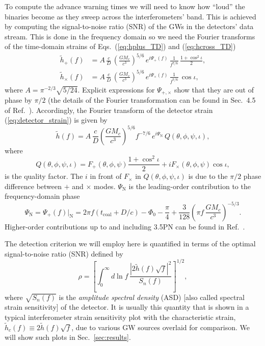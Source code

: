 \documentclass[11pt,a4paper]{article}
\newcommand{\f}{\frac}
\newcommand{\be}{\begin{equation}}
\newcommand{\ee}{\end{equation}}
\begin{document}
To compute the advance warning times we will need to know how ``loud'' the binaries become as they sweep across the interferometers' band.
This is achieved by computing the signal-to-noise ratio (SNR) of the GWs in the detectors' data stream.
This is done in the frequency domain so we need the Fourier transforms of the time-domain strains of Eqs.~(\ref{eq:hplus_TD}) and (\ref{eq:hcross_TD})
%
\begin{align}
 \tilde{h}_+(f) &= A \, \f{c}{D}\, \left(\f{G M_c}{c^3}\right)^{5/6}\, e^{i \Psi_+(f)}\, \f{1}{f^{7/6}}\,  \f{1+\cos^2\iota}{2}  ,\label{eq:hplus_FD}\\
 \tilde{h}_\times(f) & = A \, \f{c}{D}\, \left(\f{G M_c}{c^3}\right)^{5/6}\, e^{i \Psi_\times(f)}\, \f{1}{f^{7/6}}\, \cos\iota \label{eq:hcross_FD},
\end{align}
%
%
where $A= \pi^{-2/3} \sqrt{5/24}$.
Explicit expressions for $\Psi_{+,\times}$ show that they are out of phase by $\pi/2$
(the details of the Fourier transformation can be found in Sec.~4.5 of Ref.~\cite{Maggiore}).
Accordingly, the Fourier transform of the detector strain (\ref{eq:detector_strain}) is given by
%
\be
\tilde{h}(f) = A\, \f{c}{D}\left(\f{G M_c}{c^3}\right)^{5/6} f^{-7/6}\, e^{i\Psi_\text{N}}\, Q(\theta,\phi,\psi,\iota), \label{eq:strain_FD}
\ee
%
where 
%
\be
Q(\theta,\phi,\psi,\iota) = F_+(\theta,\phi,\psi)\f{1+\cos^2\iota}{2}  + i F_\times(\theta,\phi,\psi) \cos\iota \label{eq:Q},
\ee
%
is the quality factor.
The $i$ in front of $F_\times$ in $Q(\theta,\phi,\psi,\iota)$ is due to the $\pi/2$ phase difference between $+$ and $\times$ modes.
$\Psi_\text{N}$ is the leading-order contribution to the frequency-domain phase
%
\be
\Psi_\text{N}=\Psi_+(f)|_\text{N} = 2\pi f (t_\text{coal}+D/c)-\Phi_0-\f{\pi}{4}+ \f{3}{128}\left(\pi f\,\f{G M_c}{c^3}\right)^{-5/3} \label{eq:phase_FD}.
\ee
%
%
Higher-order contributions up to and including 3.5PN can be found in Ref.~\cite{SchutzLRR}.

The detection criterion we will employ here is quantified in terms of the optimal signal-to-noise ratio (SNR) defined by
%
\be
\rho=\left[ \int_0^\infty d\ln f\, \f{|2\tilde{h}(f)\sqrt{f}|^2}{S_n(f)}\right]^{1/2} \label{eq:SNR},
\ee
%
where $\sqrt{S_n(f)}$ is the {\it amplitude spectral density} (ASD) [also called spectral strain sensitivity] of the detector.
It is usually this quantity that is shown in a typical interferometer strain sensitivity plot with the characteristic strain, $\tilde{h}_c(f)\equiv2\tilde{h}(f)\sqrt{f}$, 
due to various GW sources overlaid for comparison. 
%
We will show such plots in Sec.~\ref{sec:results}.
\end{document}
